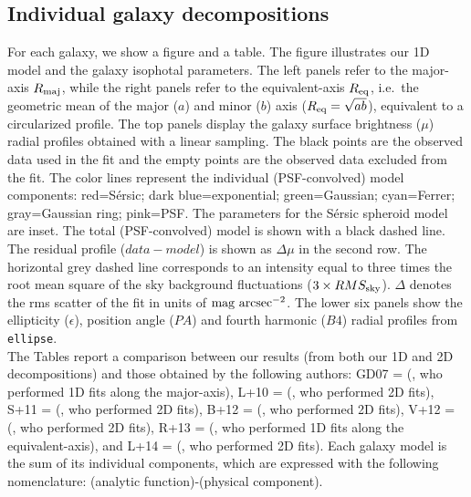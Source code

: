 \documentclass[preprint2]{emulateapj}
\begin{document}
\clearpage

  \onecolumngrid
  \subsection{Individual galaxy decompositions}
  \label{sec:indgal}

  For each galaxy, we show a figure and a table. 
  The figure illustrates our 1D model and the galaxy isophotal parameters. 
  The left panels refer to the major-axis $R_{\rm maj}$, 
  while the right panels refer to the equivalent-axis $R_{\rm eq}$, 
  i.e.~the geometric mean of the major ($a$) and minor ($b$) axis ($R_{\rm eq} = \sqrt{ab}$), 
  equivalent to a circularized profile.
  The top panels display the galaxy surface brightness ($\mu$) radial profiles obtained with a linear sampling. 
  The black points are the observed data used in the fit and the empty points are the observed data excluded from the fit.  
  The color lines represent the individual (PSF-convolved) model components:
  red=S\'ersic; dark blue=exponential; green=Gaussian; cyan=Ferrer; gray=Gaussian ring; pink=PSF. 
  The parameters for the S\'ersic spheroid model are inset.
  The total (PSF-convolved) model is shown with a black dashed line. 
  The residual profile ($data - model$) is shown as $\Delta \mu$ in the second row.
  The horizontal grey dashed line corresponds to an intensity 
  equal to three times the root mean square of the sky background fluctuations ($3 \times RMS_{\rm sky}$).
  $\Delta$ denotes the rms scatter of the fit in units of $\rm mag~arcsec^{-2}$.
  The lower six panels show the ellipticity ($\epsilon$), position angle ($PA$) and fourth harmonic ($B4$) radial profiles from {\tt ellipse}. \\
  The Tables report a comparison between our results (from both our 1D and 2D decompositions) and those obtained by the following authors: 
  GD07 = \citeauthor{grahamdriver2007} (\citeyear{grahamdriver2007}, who performed 1D fits along the major-axis), 
  L+10 = \citeauthor{laurikainen2010} (\citeyear{laurikainen2010}, who performed 2D fits), 
  S+11 = \citeauthor{sani2011} (\citeyear{sani2011}, who performed 2D fits), 
  B+12 = \citeauthor{beifiori2012} (\citeyear{beifiori2012}, who performed 2D fits), 
  V+12 = \citeauthor{vika2012} (\citeyear{vika2012}, who performed 2D fits), 
  R+13 = \citeauthor{rusli2013} (\citeyear{rusli2013}, who performed 1D fits along the equivalent-axis),
  and L+14 = \citeauthor{lasker2014data} (\citeyear{lasker2014data}, who performed 2D fits).
  Each galaxy model is the sum of its individual components, which are expressed with the following nomenclature: (analytic function)-(physical component).
\end{document}
